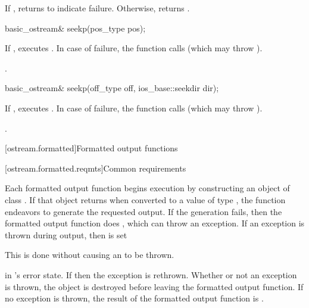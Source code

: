 \begin{itemdescr}
\pnum
\returns
If
,
returns
to indicate failure.
Otherwise, returns
.
\end{itemdescr}

%
\begin{itemdecl}
basic_ostream& seekp(pos_type pos);
\end{itemdecl}

\begin{itemdescr}
\pnum
\effects
If
,
executes
.
In case of failure, the function calls
(which may throw
).

\pnum
\returns
{}.
\end{itemdescr}

%
\begin{itemdecl}
basic_ostream& seekp(off_type off, ios_base::seekdir dir);
\end{itemdecl}

\begin{itemdescr}
\pnum
\effects
If
,
executes
.
In case of failure, the function calls 
(which may throw ).

\pnum
\returns
{}.
\end{itemdescr}

[ostream.formatted]{Formatted output functions}

[ostream.formatted.reqmts]{Common requirements}

\pnum
Each formatted output function begins execution by constructing an object of class
.
If that object returns
when converted to a value of type
,
the function endeavors
to generate the requested output.
If the generation fails, then the formatted output function does
,
which can throw an exception.
If an exception is thrown during output, then
is set
\begin{footnote}
This is done without causing an
to be thrown.
\end{footnote}
in
's
error state.
If
then the exception is rethrown.
Whether or not an exception is thrown, the
object is destroyed before leaving the formatted output function.
If no exception is thrown, the result of the formatted output function
is
.

